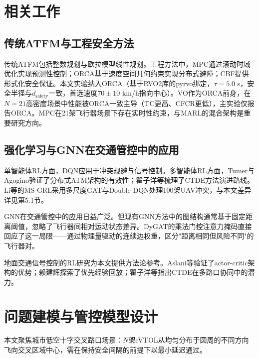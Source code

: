 \documentclass[12pt,a4paper,UTF8]{ctexart}
\begin{document}
\section{相关工作}

\subsection{传统ATFM与工程安全方法}

传统ATFM包括整数规划与欧拉模型线性规划\cite{ref2}。工程方法中，MPC\cite{ref3}通过滚动时域优化实现预测性控制；ORCA\cite{ref4}基于速度空间几何约束实现分布式避障；CBF\cite{ref5}提供形式化安全保证。本文实验纳入ORCA（基于RVO2库的pyrvo绑定，$\tau=5.0$ s，安全半径与$d_{\text{safety}}$一致，首选速度$70\pm10$ km/h指向中心）。VO作为ORCA前身，在$N=21$高密度场景中性能被ORCA一致主导（TC更高、CFCR更低），主实验仅报告ORCA。MPC在21架飞行器场景下存在实时性约束，与MARL的混合架构是重要研究方向。

\subsection{强化学习与GNN在交通管控中的应用}

单智能体RL方面，DQN应用于冲突规避与信号控制\cite{ref12,ref15,ref16,ref17,ref18,ref19,ref20,ref21,ref22}。多智能体RL方面，Tumer与Agogino\cite{ref7,ref14,ref24}验证了分布式ATM架构的有效性；翟子洋等\cite{ref13}梳理了CTDE方法演进路线。Li等\cite{ref10}的MS-GRL采用多尺度GAT与Double DQN处理100架UAV冲突，与本文差异详见第5.1节。

GNN在交通管控中的应用日益广泛\cite{ref10}。但现有GNN方法中的图结构通常基于固定距离阈值，忽略了飞行器间相对运动状态差异。DyGAT的乘法门控注意力掩码直接回应了这一局限——通过物理量驱动的连续边权重，区分"距离相同但风险不同"的飞行器对。

地面交通信号控制的RL研究为本文提供方法论参考。Aslani等\cite{ref12}验证了actor-critic架构的优势；赖建辉\cite{ref17}探索了优先经验回放；翟子洋等\cite{ref13}指出CTDE在多路口协同中的潜力。

\section{问题建模与管控模型设计}

本文聚焦城市低空十字交叉路口场景：$N$架eVTOL从均匀分布于圆周的不同方向飞向交叉区域中心，需在保持安全间隔的前提下以最小延迟通过。
\end{document}
